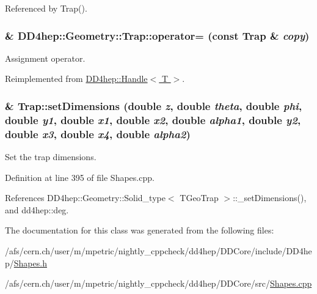 Referenced by Trap().\hypertarget{class_d_d4hep_1_1_geometry_1_1_trap_ab77ba113f9b9a64755f8c4f20c076e70}{
\subsubsection[{operator=}]{\& DD4hep::Geometry::Trap::operator= (const {\bf Trap} \& {\em copy})}}
\label{class_d_d4hep_1_1_geometry_1_1_trap_ab77ba113f9b9a64755f8c4f20c076e70}


Assignment operator. 

Reimplemented from \hyperlink{class_d_d4hep_1_1_handle_a9bbf8f498df42e81ad26fb00233505a6}{DD4hep::Handle$<$ T $>$}.\hypertarget{class_d_d4hep_1_1_geometry_1_1_trap_a577c150f75380ee4b93ec1c339066561}{
\subsubsection[{setDimensions}]{ \& Trap::setDimensions (double {\em z}, \/  double {\em theta}, \/  double {\em phi}, \/  double {\em y1}, \/  double {\em x1}, \/  double {\em x2}, \/  double {\em alpha1}, \/  double {\em y2}, \/  double {\em x3}, \/  double {\em x4}, \/  double {\em alpha2})}}
\label{class_d_d4hep_1_1_geometry_1_1_trap_a577c150f75380ee4b93ec1c339066561}


Set the trap dimensions. 

Definition at line 395 of file Shapes.cpp.

References DD4hep::Geometry::Solid\_\-type$<$ TGeoTrap $>$::\_\-setDimensions(), and dd4hep::deg.

The documentation for this class was generated from the following files:\begin{DoxyCompactItemize}
\item 
/afs/cern.ch/user/m/mpetric/nightly\_\-cppcheck/dd4hep/DDCore/include/DD4hep/\hyperlink{_shapes_8h}{Shapes.h}\item 
/afs/cern.ch/user/m/mpetric/nightly\_\-cppcheck/dd4hep/DDCore/src/\hyperlink{_shapes_8cpp}{Shapes.cpp}\end{DoxyCompactItemize}
